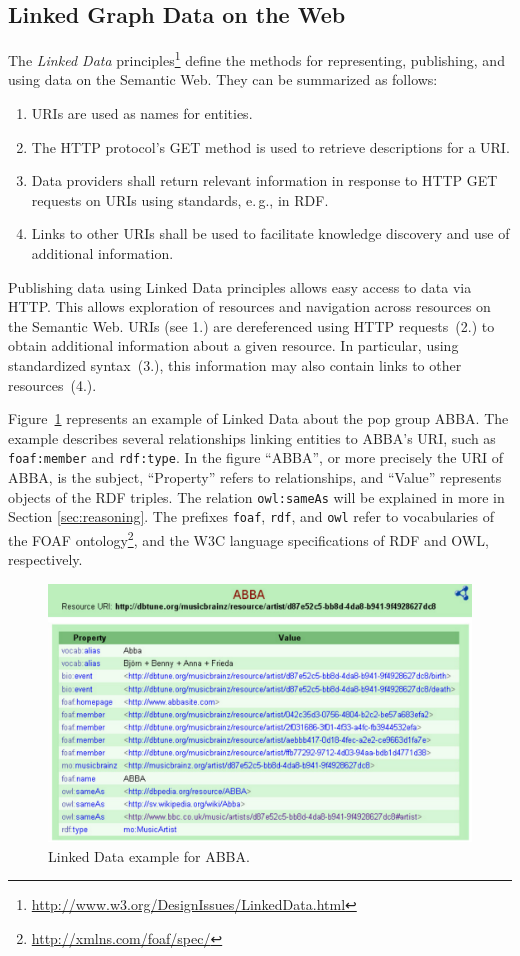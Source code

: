 \documentclass[a4paper,USenglish]{tgdk-v2021}
\newcommand{\myurl}[1]{\footnote{\url{#1}}}
\begin{document}
\subsection{Linked Graph Data on the Web}
\label{sec:linked-graph-data}
The \emph{Linked Data} principles\myurl{http://www.w3.org/DesignIssues/LinkedData.html} define the methods for representing, publishing, and using data on the Semantic Web.
They can be summarized as follows:
\begin{enumerate}
\item URIs are used as names for entities.
\item The HTTP protocol's GET method is used to retrieve descriptions for a URI.
\item Data providers shall return relevant information in response to HTTP GET requests on URIs using standards, e.\,g., in RDF.
\item Links to other URIs shall be used to facilitate knowledge discovery and use of additional information.
\end{enumerate}
Publishing data using Linked Data principles allows easy access to data via HTTP.
This allows exploration of resources and navigation across resources on the Semantic Web.
URIs (see 1.) are dereferenced using HTTP requests~(2.) to obtain additional information about a given resource.
In particular, using standardized syntax~(3.), this information may also contain links to other resources~(4.).

Figure~\ref{fig:abba_linked_data} represents an example of Linked Data about the pop group ABBA.
The example describes several relationships linking entities to ABBA's URI, such as {\tt foaf:member} and {\tt rdf:type}.
In the figure ``ABBA'', or more precisely the URI of ABBA, is the subject, ``Property'' refers to relationships, and ``Value'' represents objects of the RDF triples.
The relation {\tt owl:sameAs} will be explained in more in Section \ref{sec:reasoning}. 
The prefixes \texttt{foaf}, \texttt{rdf}, and \texttt{owl} refer to vocabularies of the FOAF ontology\myurl{http://xmlns.com/foaf/spec/}, and the W3C language specifications of RDF and OWL, respectively.
\begin{figure}[ht]
  \centering
  \includegraphics[width=\textwidth]{figs/abba-linked-data}
\caption{Linked Data example for ABBA.}\label{fig:abba_linked_data}
\end{figure}
\end{document}
